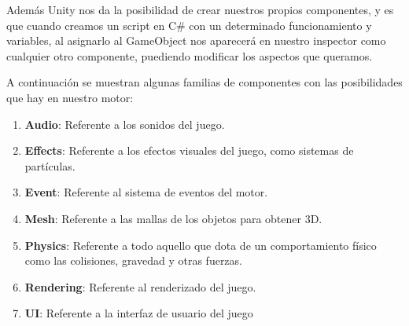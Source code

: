 Además Unity nos da la posibilidad de crear nuestros propios componentes, y es que cuando creamos un script en C\# con un determinado funcionamiento y variables, al asignarlo al GameObject nos aparecerá en nuestro inspector como cualquier otro componente, puediendo modificar los aspectos que queramos.

A continuación se muestran algunas familias de componentes con las posibilidades que hay en nuestro motor:
\begin{enumerate}
    \item \textbf{Audio}: Referente a los sonidos del juego.
    \item \textbf{Effects}: Referente a los efectos visuales del juego, como sistemas de partículas.
    \item \textbf{Event}: Referente al sistema de eventos del motor.
    \item \textbf{Mesh}: Referente a las mallas de los objetos para obtener 3D.
    \item \textbf{Physics}: Referente a todo aquello que dota de un comportamiento físico como las colisiones, gravedad y otras fuerzas.
    \item \textbf{Rendering}: Referente al renderizado del juego.
    \item \textbf{UI}: Referente a la interfaz de usuario del juego
\end{enumerate}
